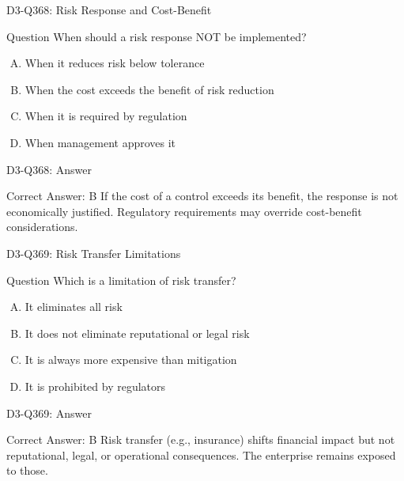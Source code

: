 \documentclass{beamer}
\begin{document}
\begin{frame}{D3-Q368: Risk Response and Cost-Benefit}
	\begin{block}{Question}
		When should a risk response NOT be implemented?
	\end{block}
	\begin{enumerate}[(A)]
		\item When it reduces risk below tolerance
		\item When the cost exceeds the benefit of risk reduction
		\item When it is required by regulation
		\item When management approves it
	\end{enumerate}
\end{frame}
\begin{frame}{D3-Q368: Answer}
	\begin{block}{Correct Answer: B}
		If the cost of a control exceeds its benefit, the response is not economically justified. Regulatory requirements may override cost-benefit considerations.
	\end{block}
\end{frame}

\begin{frame}{D3-Q369: Risk Transfer Limitations}
	\begin{block}{Question}
		Which is a limitation of risk transfer?
	\end{block}
	\begin{enumerate}[(A)]
		\item It eliminates all risk
		\item It does not eliminate reputational or legal risk
		\item It is always more expensive than mitigation
		\item It is prohibited by regulators
	\end{enumerate}
\end{frame}
\begin{frame}{D3-Q369: Answer}
	\begin{block}{Correct Answer: B}
		Risk transfer (e.g., insurance) shifts financial impact but not reputational, legal, or operational consequences. The enterprise remains exposed to those.
	\end{block}
\end{frame}
\end{document}
